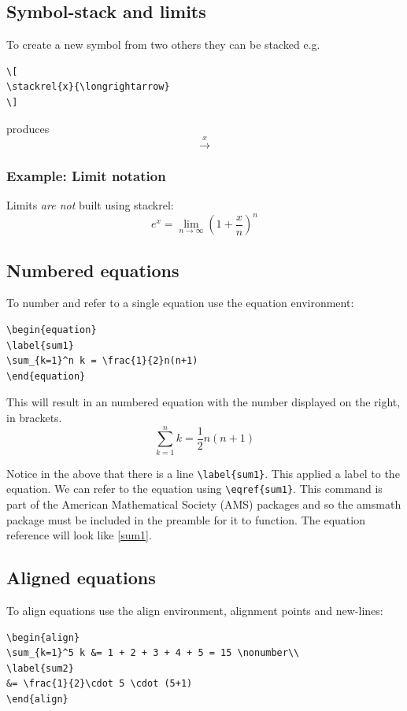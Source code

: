 \documentclass[a4paper,14pt]{extarticle}
\begin{document}
\subsection{Symbol-stack and limits}

To create a new symbol from two others they can be stacked e.g. 
\begin{verbatim}
\[
\stackrel{x}{\longrightarrow}
\]
\end{verbatim}
produces
\[
\stackrel{x}{\longrightarrow}
\]

\subsubsection{Example: Limit notation}

Limits \emph{are not} built using stackrel:
\[
e^x = \lim_{n\rightarrow \infty} \left(1 + \frac{x}{n}\right)^n
\]


\subsection{Numbered equations}

To number and refer to a single equation use the equation environment:
\begin{verbatim}
\begin{equation}
\label{sum1}
\sum_{k=1}^n k = \frac{1}{2}n(n+1)
\end{equation}
\end{verbatim}

This will result in an numbered equation with the number displayed on the right, in brackets.
\begin{equation}
\label{sum1}
\sum_{k=1}^n k = \frac{1}{2}n(n+1)
\end{equation}

Notice in the above that there is a line \verb=\label{sum1}=. This applied a label to the equation. We can refer to the equation using \verb=\eqref{sum1}=. This command is part of the American Mathematical Society (AMS) packages and so the amsmath package must be included in the preamble for it to function. The equation reference will look like \eqref{sum1}. 

\subsection{Aligned equations}

To align equations use the align environment, alignment points and new-lines:
\begin{verbatim}
\begin{align}
\sum_{k=1}^5 k &= 1 + 2 + 3 + 4 + 5 = 15 \nonumber\\
\label{sum2}
&= \frac{1}{2}\cdot 5 \cdot (5+1)
\end{align}
\end{verbatim}
\end{document}
